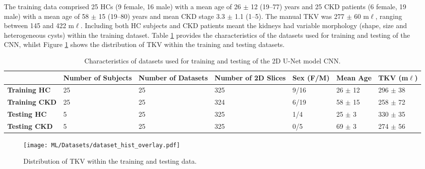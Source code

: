 The training data comprised 25 \acp{HC} (9 female, 16 male) with a mean age of 26 $\pm$ 12 (19–77) years and 25 \ac{CKD} patients (6 female, 19 male) with a mean age of 58 $\pm$ 15 (19–80) years and mean \ac{CKD} stage 3.3 $\pm$ 1.1 (1--5). The manual \ac{TKV} was 277 $\pm$ 60 m$\ell$, ranging between 145 and 422 m$\ell$. Including both \ac{HC} subjects and \ac{CKD} patients meant the kidneys had variable morphology (shape, size and heterogeneous cysts) within the training dataset. Table \ref{tab:ml_datasets} provides the characteristics of the datasets used for training and testing of the \ac{CNN}, whilst Figure \ref{fig:ml_true_tkv_hist} shows the distribution of \ac{TKV} within the training and testing datasets.
\begin{table}[H]
	\centering
	\begin{adjustbox}{width=1.0\textwidth, center}
	\begin{tabularx}{1.1\textwidth}{X|X|X|X|X|X|X}
		& \textbf{Number of Subjects} & \textbf{Number of Datasets} & \textbf{Number of 2D Slices} & \textbf{Sex (F/M)} & \textbf{Mean Age} & \textbf{TKV (m$\ell$)} \\ \hline
		\textbf{Training HC}  & 25                          & 25                          & 325                          & 9/16               & 26 $\pm$ 12       & 296 $\pm$ 38           \\
		\hline
		\textbf{Training CKD} & 25                          & 25                          & 324                          & 6/19               & 58 $\pm$ 15       & 258 $\pm$ 72           \\
		\hline
		\textbf{Testing HC}   & 5                           & 25                          & 325                          & 1/4                & 25 $\pm$ 3        & 330 $\pm$ 35           \\
		\hline
		\textbf{Testing CKD} & 5                           & 25                          & 325                          & 0/5                & 69 $\pm$ 3        & 274 $\pm$ 56          
	\end{tabularx}
	\end{adjustbox}
	\caption{Characteristics of datasets used for training and testing of the 2D U-Net model \ac{CNN}.}
	\label{tab:ml_datasets}
\end{table}
\begin{figure}[H]
	\centering
	\texttt{[image: ML/Datasets/dataset\_hist\_overlay.pdf]}
	\caption{Distribution of \ac{TKV} within the training and testing data.}
	\label{fig:ml_true_tkv_hist}	
\end{figure}

